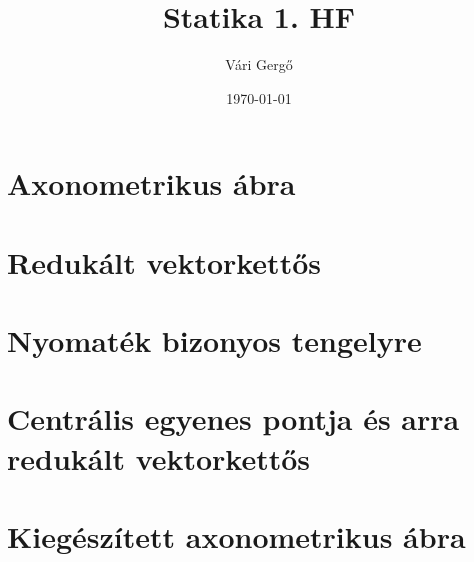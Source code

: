 \documentclass[a4paper]{article}
\title{Statika 1. HF}
\author{Vári Gergő}
\date{\today}
\begin{document}
\maketitle

\section{Axonometrikus ábra}
\begin{center}

\end{center}

\break

\section{Redukált vektorkettős}


\section{Nyomaték bizonyos tengelyre}


	\section{Centrális egyenes pontja és arra redukált vektorkettős}
	

	\section{Kiegészített axonometrikus ábra}
	\begin{center}
	
	\end{center}
\end{document}

